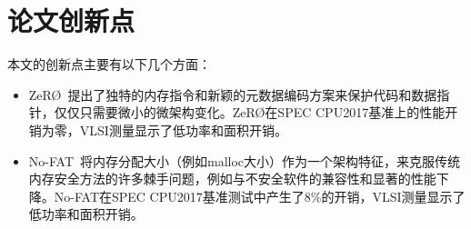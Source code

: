 %
%

\chapter*{论文创新点}
\thispagestyle{empty}

本文的创新点主要有以下几个方面：

\begin{itemize}
\item ZeRØ~\cite{ziad2021zero}提出了独特的内存指令和新颖的元数据编码方案来保护代码和数据指针，仅仅只需要微小的微架构变化。ZeRØ在SPEC CPU2017基准上的性能开销为零，VLSI测量显示了低功率和面积开销。
\item No-FAT~\cite{ziad2021no}将内存分配大小（例如malloc大小）作为一个架构特征，来克服传统内存安全方法的许多棘手问题，例如与不安全软件的兼容性和显著的性能下降。No-FAT在SPEC CPU2017基准测试中产生了8\%的开销，VLSI测量显示了低功率和面积开销。
\end{itemize}
